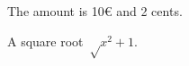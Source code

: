 \documentclass{article}
\begin{document}
  The amount is 10€ and 2 cents.

  A square root $√{x^2+1}$.
\end{document}
